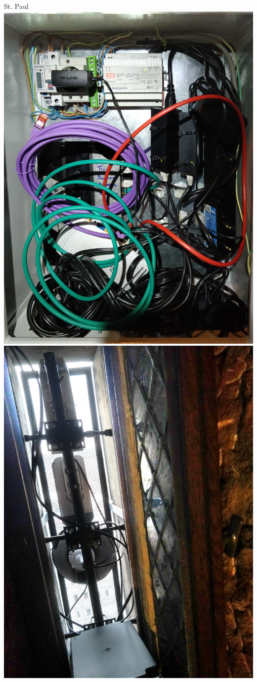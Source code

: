 \begin{frame}{St. Paul}
{        \includegraphics[height=0.86\textheight]{img/stpaul-kasten}
        \hfill
        \includegraphics[height=0.86\textheight]{img/stpaul-fenster}
}
\end{frame}
